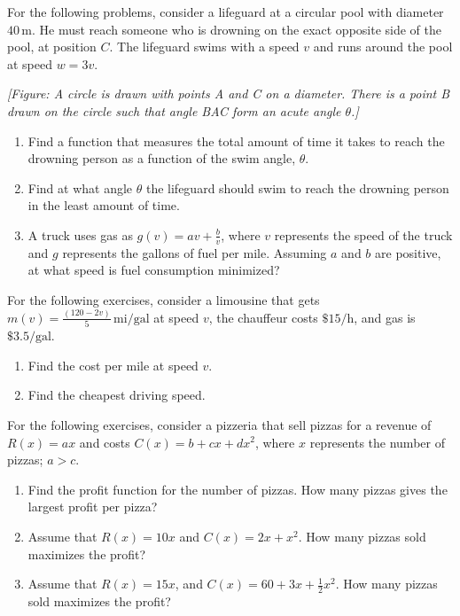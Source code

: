 \documentclass{exercises}
\begin{document}
For the following problems, consider a lifeguard at a circular pool with diameter $40\,\text{m}$. He must reach someone who is drowning on the exact opposite side of the pool, at position $C$. The lifeguard swims with a speed $v$ and runs around the pool at speed $w=3v$.


\textit{[Figure: A circle is drawn with points A and C on a diameter. There is a point B drawn on the circle such that angle BAC form an acute angle $\theta$.]}

\begin{enumerate}[resume]
\item Find a function that measures the total amount of time it takes to reach the drowning person as a function of the swim angle, $\theta$.
\item Find at what angle $\theta$ the lifeguard should swim to reach the drowning person in the least amount of time.
\item A truck uses gas as $g(v)=av+\frac{b}{v}$, where $v$ represents the speed of the truck and $g$ represents the gallons of fuel per mile. Assuming $a$ and $b$ are positive, at what speed is fuel consumption minimized?
\end{enumerate}

For the following exercises, consider a limousine that gets $m(v)=\frac{(120-2v)}{5}\,\text{mi/gal}$ at speed $v$, the chauffeur costs $\text{\$15/h}$, and gas is $\$3.5/\text{gal}$.

\begin{enumerate}[resume]
\item Find the cost per mile at speed $v$.
\item Find the cheapest driving speed.
\end{enumerate}

For the following exercises, consider a pizzeria that sell pizzas for a revenue of $R(x)=ax$ and costs $C(x)=b+cx+dx^{2}$, where $x$ represents the number of pizzas; $a>c$.

\begin{enumerate}[resume]
\item Find the profit function for the number of pizzas. How many pizzas gives the largest profit per pizza?
\item Assume that $R(x)=10x$ and $C(x)=2x+x^{2}$. How many pizzas sold maximizes the profit?
\item Assume that $R(x)=15x$, and $C(x)=60+3x+\frac{1}{2}x^{2}$. How many pizzas sold maximizes the profit?
\end{enumerate}
\end{document}
